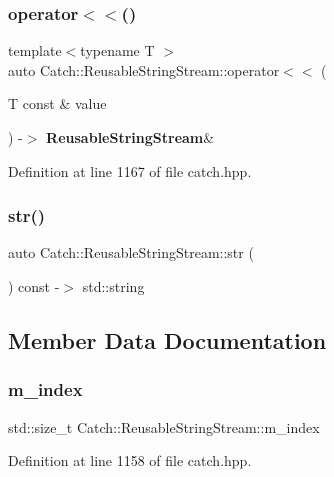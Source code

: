 \subsubsection{operator$<$$<$()}
{\footnotesize\ttfamily template$<$typename T $>$ \\
auto Catch\+::\+Reusable\+String\+Stream\+::operator$<$$<$ (\begin{DoxyParamCaption}\item[{T const \&}]{value }\end{DoxyParamCaption}) -\/$>$ \textbf{ Reusable\+String\+Stream}\& \hspace{0.3cm}{\ttfamily [inline]}}



Definition at line 1167 of file catch.\+hpp.

\mbox{\label{class_catch_1_1_reusable_string_stream_a0e9ecf260b2a5d35f4886ef0d51f6270}} 
\subsubsection{str()}
{\footnotesize\ttfamily auto Catch\+::\+Reusable\+String\+Stream\+::str (\begin{DoxyParamCaption}{ }\end{DoxyParamCaption}) const -\/$>$  std\+::string}



\subsection{Member Data Documentation}
\mbox{\label{class_catch_1_1_reusable_string_stream_a6e8154ffe67117de424c491e3b192504}} 
\subsubsection{m\_index}
{\footnotesize\ttfamily std\+::size\+\_\+t Catch\+::\+Reusable\+String\+Stream\+::m\+\_\+index\hspace{0.3cm}{\ttfamily [private]}}



Definition at line 1158 of file catch.\+hpp.

\mbox{\label{class_catch_1_1_reusable_string_stream_ae8dc0aa8ab418990869cd5ea9ee51f14}} 
